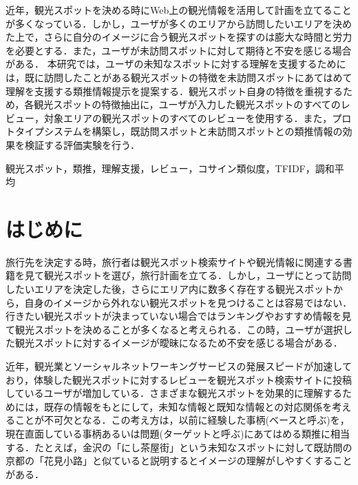 \documentclass{deimj}
\begin{document}
\pagestyle{empty}
\begin{jabstract}
近年，観光スポットを決める時にWeb上の観光情報を活用して計画を立てることが多くなっている．しかし，ユーザが多くのエリアから訪問したいエリアを決めた上で，さらに自分のイメージに合う観光スポットを探すのは膨大な時間と労力を必要とする．また，ユーザが未訪問スポットに対して期待と不安を感じる場合がある．
本研究では，ユーザの未知なスポットに対する理解を支援するためには，既に訪問したことがある観光スポットの特徴を未訪問スポットにあてはめて理解を支援する類推情報提示を提案する．観光スポット自身の特徴を重視するため，各観光スポットの特徴抽出に，ユーザが入力した観光スポットのすべてのレビュー，対象エリアの観光スポットのすべてのレビューを使用する．また，プロトタイプシステムを構築し，既訪問スポットと未訪問スポットとの類推情報の効果を検証する評価実験を行う．
\end{jabstract}

\begin{jkeyword}
観光スポット，類推，理解支援，レビュー，コサイン類似度，TFIDF，調和平均
\end{jkeyword}
\maketitle


\section{はじめに}
\label{sec:Introduction}
旅行先を決定する時，旅行者は観光スポット検索サイトや観光情報に関連する書籍を見て観光スポットを選び，旅行計画を立てる．しかし，ユーザにとって訪問したいエリアを決定した後，さらにエリア内に数多く存在する観光スポットから，自身のイメージから外れない観光スポットを見つけることは容易ではない．行きたい観光スポットが決まっていない場合ではランキングやおすすめ情報を見て観光スポットを決めることが多くなると考えられる．この時，ユーザが選択した観光スポットに対するイメージが曖昧になるため不安を感じる場合がある．

近年，観光業とソーシャルネットワーキングサービスの発展スピードが加速しており，体験した観光スポットに対するレビューを観光スポット検索サイトに投稿しているユーザが増加している．さまざまな観光スポットを効果的に理解するためには，既存の情報をもとにして，未知な情報と既知な情報との対応関係を考えることが不可欠となる．この考え方は，以前に経験した事柄(ベースと呼ぶ)を，現在直面している事柄あるいは問題(ターゲットと呼ぶ)にあてはめる類推に相当する．たとえば，金沢の「にし茶屋街」という未知なスポットに対して既訪問の京都の「花見小路」と似ていると説明するとイメージの理解がしやすくすることがある．
\end{document}

